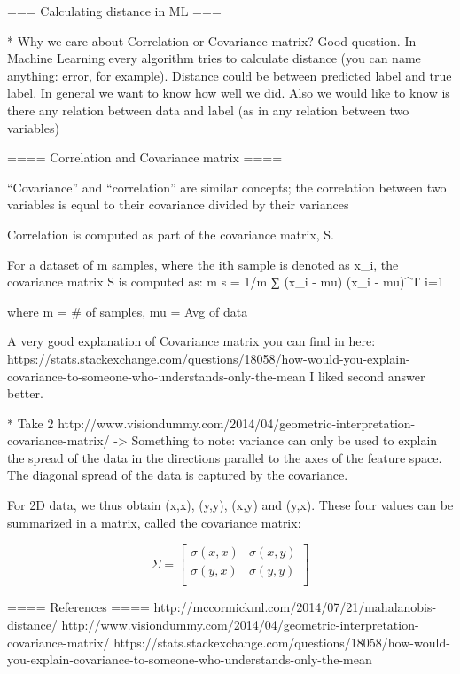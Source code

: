 === Calculating distance in ML ===

* Why we care about Correlation or Covariance matrix?
Good question. In Machine Learning every algorithm tries to calculate distance
(you can name anything: error, for example). Distance could be between predicted
label and true label. In general we want to know how well we did. Also we would
like to know is there any relation between data and label (as in any relation
between two variables)

==== Correlation and Covariance matrix ====

“Covariance” and “correlation” are similar concepts; the correlation between
two variables is equal to their covariance divided by their variances

Correlation is computed as part of the covariance matrix, S.

For a dataset of m samples, where the ith sample is denoted as x_i, the
covariance matrix S is computed as:
        m
s = 1/m ∑ (x_i - mu) (x_i - mu)^T
       i=1

where m = # of samples, mu = Avg of data

A very good explanation of Covariance matrix you can find in here:
https://stats.stackexchange.com/questions/18058/how-would-you-explain-covariance-to-someone-who-understands-only-the-mean
I liked second answer better.

* Take 2
http://www.visiondummy.com/2014/04/geometric-interpretation-covariance-matrix/
-> Something to note:
variance can only be used to explain the spread of the data in the directions
parallel to the axes of the feature space. The diagonal spread of the data is
captured by the covariance.

For 2D data, we thus obtain \sigma(x,x), \sigma(y,y), \sigma(x,y) and \sigma(y,x).
These four values can be summarized in a matrix, called the covariance matrix:

 \begin{equation*} \Sigma = \begin{bmatrix} \sigma(x,x) & \sigma(x,y) \\[0.3em] \sigma(y,x) & \sigma(y,y) \\[0.3em] \end{bmatrix} \end{equation*}


==== References ====
http://mccormickml.com/2014/07/21/mahalanobis-distance/
http://www.visiondummy.com/2014/04/geometric-interpretation-covariance-matrix/
https://stats.stackexchange.com/questions/18058/how-would-you-explain-covariance-to-someone-who-understands-only-the-mean
